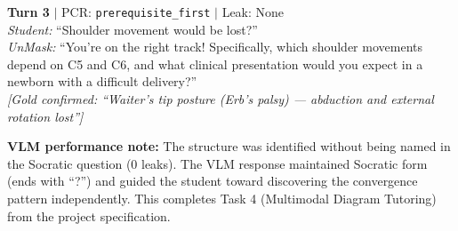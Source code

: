 \documentclass[11pt]{article}
\begin{document}
\noindent\textbf{Turn 3} $|$ PCR: \texttt{prerequisite\_first} $|$ Leak: None\\
\textit{Student:} ``Shoulder movement would be lost?''\\
\textit{UnMask:} ``You're on the right track! Specifically, which shoulder movements depend on C5 and C6, and what clinical presentation would you expect in a newborn with a difficult delivery?''\\
{\small\textit{[Gold confirmed: ``Waiter's tip posture (Erb's palsy) --- abduction and external rotation lost'']}}

\bigskip
\noindent\textbf{VLM performance note:} The structure was identified without being named in the Socratic question (0 leaks). The VLM response maintained Socratic form (ends with ``?'') and guided the student toward discovering the convergence pattern independently. This completes Task 4 (Multimodal Diagram Tutoring) from the project specification.
\end{document}

